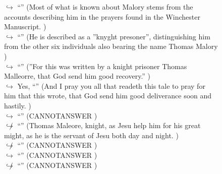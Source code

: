 \documentclass[11pt,a4paper, onecolumn]{article}
\begin{document}
\begin{figure}[t] \small \begin{tcolorbox}[boxsep=0pt,left=5pt,right=0pt,top=2pt,colback = yellow!5] \begin{dialogue}
 \small 
\colorbox{pink!25}{$\hookrightarrow$}
{ ``'' (Most of what is known about Malory stems from the accounts describing him in the prayers found in the Winchester Manuscript. ) }
\\
\colorbox{pink!25}{$\hookrightarrow$}
{ ``'' (He is described as a ''knyght presoner'', distinguishing him from the other six individuals also bearing the name Thomas Malory ) }
\\
\colorbox{pink!25}{$\hookrightarrow$}
{ ``'' (''For this was written by a knight prisoner Thomas Malleorre, that God send him good recovery.'' ) }
\\
\colorbox{pink!25}{$\hookrightarrow$}
\colorbox{red!25}{Yes,}
{ ``'' (And I pray you all that readeth this tale to pray for him that this wrote, that God send him good deliverance soon and hastily. ) }
\\
\colorbox{pink!25}{$\hookrightarrow$}
{ ``'' (CANNOTANSWER ) }
\\
\colorbox{pink!25}{$\not\hookrightarrow$}
{ ``'' (Thomas Maleore, knight, as Jesu help him for his great might, as he is the servant of Jesu both day and night. ) }
\\
\colorbox{pink!25}{$\not\hookrightarrow$}
{ ``'' (CANNOTANSWER ) }
\\
\colorbox{pink!25}{$\hookrightarrow$}
{ ``'' (CANNOTANSWER ) }
\\
\colorbox{pink!25}{$\not\hookrightarrow$}
{ ``'' (CANNOTANSWER ) }
\\
 \end{dialogue}\end{tcolorbox}\end{figure}
\end{document}
